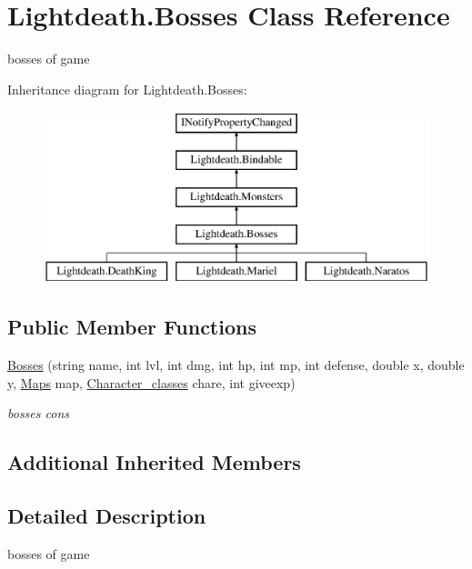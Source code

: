 \hypertarget{class_lightdeath_1_1_bosses}{}\section{Lightdeath.\+Bosses Class Reference}
\label{class_lightdeath_1_1_bosses}


bosses of game  


Inheritance diagram for Lightdeath.\+Bosses\+:\begin{figure}[H]
\begin{center}
\leavevmode
\includegraphics[height=5.000000cm]{class_lightdeath_1_1_bosses}
\end{center}
\end{figure}
\subsection*{Public Member Functions}
\begin{DoxyCompactItemize}
\item 
\hyperlink{class_lightdeath_1_1_bosses_a113dffb497c35f2a58242f460ad9f6c0}{Bosses} (string name, int lvl, int dmg, int hp, int mp, int defense, double x, double y, \hyperlink{class_lightdeath_1_1_maps}{Maps} map, \hyperlink{class_lightdeath_1_1_character__classes}{Character\+\_\+classes} chare, int giveexp)
\begin{DoxyCompactList}\small\item\em bosses cons \end{DoxyCompactList}\end{DoxyCompactItemize}
\subsection*{Additional Inherited Members}


\subsection{Detailed Description}
bosses of game 



